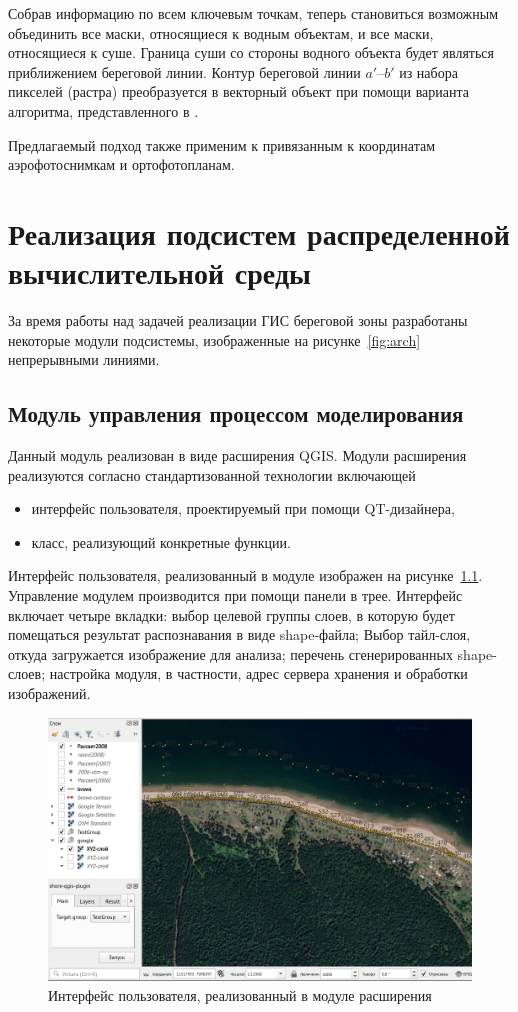 \documentclass[732,fontsize=14pt,final]{studrep}
\begin{document}
Собрав информацию по всем ключевым точкам, теперь становиться возможным объединить все маски, относящиеся к водным объектам, и все маски, относящиеся к суше. Граница суши со стороны водного объекта будет являться приближением береговой линии. Контур береговой линии $a'$--$b'$ из набора пикселей (растра) преобразуется в векторный объект при помощи варианта алгоритма, представленного в \cite{b3}.

Предлагаемый подход также применим к привязанным к координатам аэрофотоснимкам и ортофотопланам.

\chapter{Реализация подсистем распределенной вычислительной среды}\label{chap:impl}

За время работы над задачей реализации ГИС береговой зоны разработаны некоторые модули подсистемы, изображенные на рисунке~\ref{fig:arch} непрерывными линиями.

\section{Модуль управления процессом моделирования}

Данный модуль реализован в виде расширения QGIS. Модули расширения реализуются согласно стандартизованной технологии включающей
\begin{itemize}
\item интерфейс пользователя, проектируемый при помощи QT-дизайнера,
\item класс, реализующий конкретные функции.
\end{itemize}

Интерфейс пользователя, реализованный в модуле изображен на рисунке~\ref{fig:plugin-ui}. Управление модулем производится при помощи панели в трее. Интерфейс включает четыре вкладки: выбор целевой группы слоев, в которую будет помещаться результат распознавания в виде shape-файла; Выбор тайл-слоя, откуда загружается изображение для анализа; перечень сгенерированных shape-слоев; настройка модуля, в частности, адрес сервера хранения и обработки изображений.
  \begin{figure}[htp]
    \centering
    \includegraphics[width=\linewidth]{pics/plugin-ui.png}
    \caption{Интерфейс пользователя, реализованный в модуле расширения}
    \label{fig:plugin-ui}
  \end{figure}
\end{document}
